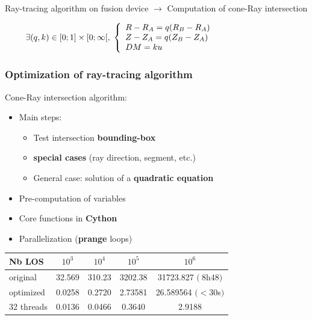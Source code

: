 \documentclass[10pt]{beamer}
\begin{document}
\begin{frame}
\vspace{0.3cm}
\begin{alertblock}{Ray-tracing algorithm on fusion device $\longrightarrow$ Computation of cone-Ray intersection}
\end{alertblock}

$$
\hspace{-3cm}
\exists (q,k) \in [0;1]\times [0;\infty[, \;
\left\{\begin{array}{ll}
R-R_A = q(R_B-R_A)\\
Z-Z_A = q(Z_B-Z_A)\\
DM = k u
\end{array}\right.
$$
	
\end{frame}


\begin{frame}
\frametitle{Optimization of ray-tracing algorithm}


Cone-Ray intersection algorithm:
	\begin{itemize}
	\item Main steps:
	\begin{itemize}
		\item Test intersection \textbf{bounding-box}
		\item \textbf{special cases} (ray direction, segment, etc.)
		\item General case: solution of a\textbf{ quadratic equation}
	\end{itemize}
	\item Pre-computation of variables
	\item Core functions in \textbf{Cython}
	\item Parallelization (\textbf{prange} loops)
	\end{itemize}
\pause
\begin{table}[h] %
    \centering
    \label{tab:LOS_init_sirrah}
     \begin{tabular}{@{}l*{4}{S[table-format=1.2e-1,scientific-notation=true]}@{}}
       \toprule
       \textbf{Nb LOS} &  {$10^3$} & {$10^4$} & {$10^5$} & {$10^6$}\\
       \midrule
       original       & 32.569 & 310.23 & 3202.38 & 31723.827 $(~8$h$48)$\\
       optimized   & 0.0258 & 0.2720 & 2.73581 & 26.589564 $(<30$s$)$\\
       32 threads & 0.0136 & 0.0466 & 0.3640 & 2.9188 \\
       \bottomrule
     \end{tabular}
\end{table}

	
\end{frame}
\end{document}
